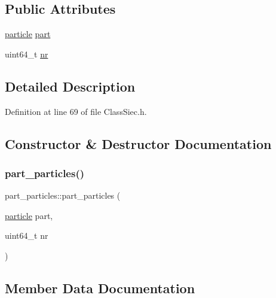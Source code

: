\subsection*{Public Attributes}
\begin{DoxyCompactItemize}
\item 
\mbox{\hyperlink{structparticle}{particle}} \mbox{\hyperlink{structpart__particles_a0f382b0ca436a15a067fdd4086d6e55c}{part}}
\item 
uint64\+\_\+t \mbox{\hyperlink{structpart__particles_ae596ac143f70897619e591081481c731}{nr}}
\end{DoxyCompactItemize}


\subsection{Detailed Description}


Definition at line 69 of file Class\+Siec.\+h.



\subsection{Constructor \& Destructor Documentation}
\mbox{\label{structpart__particles_a8e512b2ab1f29f2d2f11921b1328b4c4}} 
\subsubsection{\texorpdfstring{part\+\_\+particles()}{part\_particles()}}
{\footnotesize\ttfamily part\+\_\+particles\+::part\+\_\+particles (\begin{DoxyParamCaption}\item[{\mbox{\hyperlink{structparticle}{particle}}}]{part,  }\item[{uint64\+\_\+t}]{nr }\end{DoxyParamCaption})}



\subsection{Member Data Documentation}
\mbox{\label{structpart__particles_ae596ac143f70897619e591081481c731}} 

